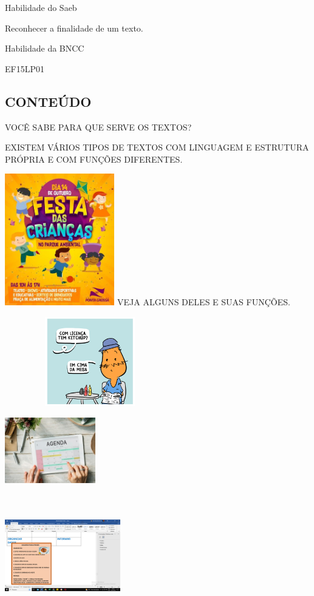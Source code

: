 {{\protect\hypertarget{_Hlk129197269}{}{}Habilidade do Saeb

Reconhecer a finalidade de um texto.

Habilidade da BNCC

EF15LP01

\subsection{CONTEÚDO}

VOCÊ SABE PARA QUE SERVE OS TEXTOS?

EXISTEM VÁRIOS TIPOS DE TEXTOS COM LINGUAGEM E ESTRUTURA PRÓPRIA E COM
FUNÇÕES DIFERENTES.

\includegraphics[width=1.87898in,height=2.25631in]{media/image86.jpeg}
VEJA ALGUNS DELES E SUAS FUNÇÕES.

\includegraphics[width=2.91667in,height=1.53611in]{media/image87.png}

\includegraphics[width=1.55208in,height=1.12778in]{media/image90.jpeg}

\includegraphics[width=1.97452in,height=2.09063in]{media/image91.png}

}}

